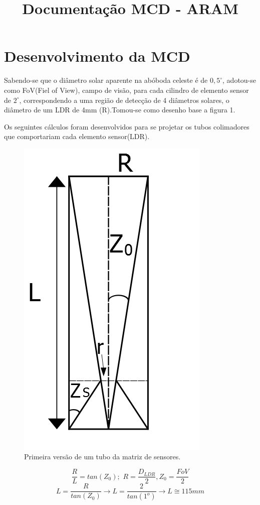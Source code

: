 \documentclass[a4paper,12pt]{article}
\title{Documentação MCD - ARAM}
\begin{document}
	\maketitle
	\section{Desenvolvimento da MCD}
	Sabendo-se que o diâmetro solar aparente na abóboda celeste é de $0,5^{\circ}$, adotou-se como FoV(Fiel of View), campo de visão, para cada cilindro de elemento sensor de $2^{\circ}$, correspondendo a uma região de detecção de 4 diâmetros solares, o diâmetro de um LDR de 4mm (R).Tomou-se como desenho base a figura 1.
	
	Os seguintes cálculos foram desenvolvidos para se projetar os tubos colimadores que comportariam cada elemento sensor(LDR).

\begin{figure}[htb] 
	\centering
	\includegraphics[scale=0.5]{MCD_1.jpg}
	\caption{Primeira versão de um tubo da matriz de sensores.}
\end{figure}

$$\frac{R}{L} = tan(Z_{0}) ; \,\,   R = \frac{D_{LDR}}{2}, Z_{0} = \frac{FoV}{2}$$
$$L = \frac{R}{tan(Z_{0})} \longrightarrow L = \frac{2}{tan(1^{o})}  \longrightarrow L \cong 115 mm$$ 
\end{document}
